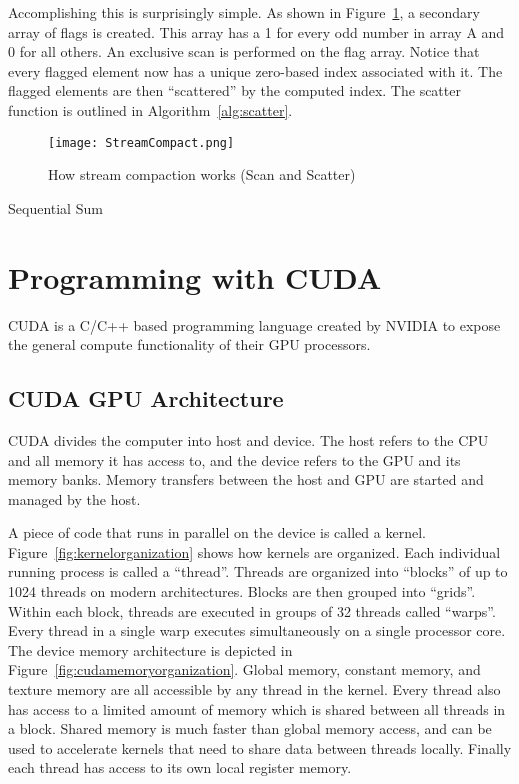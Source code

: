 Accomplishing this is surprisingly simple. As shown in Figure~\ref{fig:streamcompact}, a secondary array of flags is created. This array has a 1 for every odd number in array A and 0 for all others. An exclusive scan is performed on the flag array. Notice that every flagged element now has a unique zero-based index associated with it. The flagged elements are then ``scattered'' by the computed index. The scatter function is outlined in Algorithm~\ref{alg:scatter}.

\begin{figure}[!htpb]
    \centering
    \texttt{[image: StreamCompact.png]}
    \caption{How stream compaction works (Scan and Scatter)}
    \label{fig:streamcompact}
\end{figure}


\begin{algorithm}[!htpb]
\label{alg:scatter}
 \singlespacing
 \caption{Sequential Sum}
\end{algorithm}

\section{Programming with CUDA}
CUDA is a C/C++ based programming language created by NVIDIA to expose the general compute functionality of their GPU processors. 
\subsection{CUDA GPU Architecture}
CUDA divides the computer into host and device. The host refers to the CPU and all memory it has access to, and the device refers to the GPU and its memory banks. Memory transfers between the host and GPU are started and managed by the host.\par
A piece of code that runs in parallel on the device is called a kernel. Figure~\ref{fig:kernelorganization} shows how kernels are organized. Each individual running process is called a ``thread''. Threads are organized into ``blocks'' of up to 1024 threads on modern architectures. Blocks are then grouped into ``grids''. Within each block, threads are executed in groups of 32 threads called ``warps''. Every thread in a single warp executes simultaneously on a single processor core.
The device memory architecture is depicted in Figure~\ref{fig:cudamemoryorganization}. Global memory, constant memory, and texture memory are all accessible by any thread in the kernel. Every thread also has access to a limited amount of memory which is shared between all threads in a block. Shared memory is much faster than global memory access, and can be used to accelerate kernels that need to share data between threads locally. Finally each thread has access to its own local register memory.

